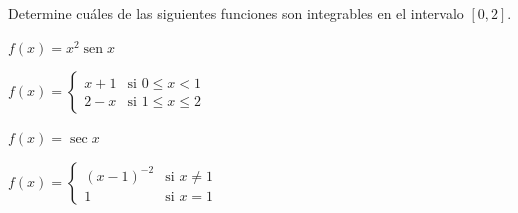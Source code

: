\item Determine cuáles de las siguientes funciones son integrables en el intervalo $[0, 2]$.
\begin{enumerate}
    \begin{minipage}{0.45\textwidth}
    \item[(a)] $f(x) = x^2 \operatorname{sen} x$
    \item[(c)] $f(x) = \begin{cases} x + 1 & \text{si } 0 \le x < 1 \\ 2 - x & \text{si } 1 \le x \le 2 \end{cases}$
    \end{minipage}%
    \begin{minipage}{0.45\textwidth}
    \item[(b)] $f(x) = \sec x$
    \item[(d)] $f(x) = \begin{cases} (x - 1)^{-2} & \text{si } x \ne 1 \\ 1 & \text{si } x = 1 \end{cases}$
    \end{minipage}
\end{enumerate}
